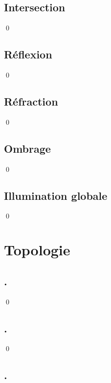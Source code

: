 \documentclass[12pt]{article}
\newcommand{\state}{\noindent}
\begin{document}
\subsection{Intersection}

\state

\qed

\subsection{Réflexion}

\state

\qed

\subsection{Réfraction}

\state

\qed

\subsection{Ombrage}

\state

\qed

\subsection{Illumination globale}

\state

\qed

\pagebreak

\section{Topologie}

\subsection{.}

\state

\qed

\subsection{.}

\state

\qed

\subsection{.}
\end{document}

